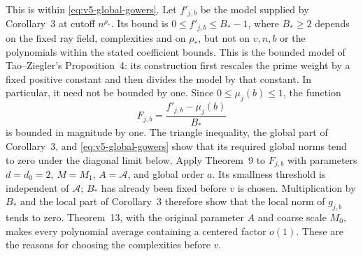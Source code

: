 This is within \eqref{eq:v5-global-gowers}. Let $f'_{j,b}$ be the
model supplied by Corollary~3 at cutoff $n^{\rho_*}$. Its bound is
$0\leq f'_{j,b}\leq B_*-1$, where $B_*\geq2$ depends on the fixed
ray field, complexities and on $\rho_*$, but not on $v,n,b$ or the polynomials
within the stated coefficient bounds. This is the bounded model of
Tao--Ziegler's Proposition~4: its construction first rescales the
prime weight by a fixed positive constant and then divides the model
by that constant. In particular, it need not be bounded by one.
Since $0\leq\mu_j(b)\leq1$, the function
\[
 F_{j,b}=\frac{f'_{j,b}-\mu_j(b)}{B_*}
\]
is bounded in magnitude by one. The triangle inequality, the global
part of Corollary~3, and \eqref{eq:v5-global-gowers} show that its
required global norms tend to zero under the diagonal limit below.
Apply Theorem~9 to $F_{j,b}$
with parameters $d=d_0=2$, $M=M_1$, $A=\mathcal A$, and global
order $a$. Its smallness threshold is independent of $\mathcal A$;
$B_*$ has already been fixed before $v$ is chosen. Multiplication
by $B_*$ and the local part of Corollary~3 therefore show that the
local norm of $g_{j,b}$ tends to zero. Theorem~13, with the original
parameter $A$ and coarse scale $M_0$, makes every polynomial average
containing a centered factor $o(1)$. These are the reasons for choosing
the complexities before $v$.
